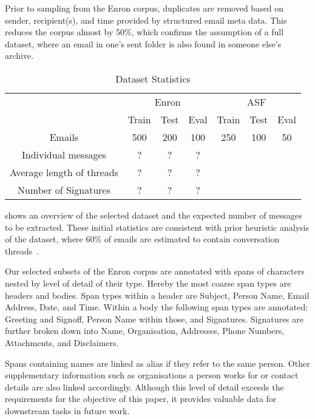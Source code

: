 \documentclass{llncs}
\begin{document}
Prior to sampling from the Enron corpus, duplicates are removed based on sender, recipient(s), and time provided by structured email meta data.
This reduces the corpus almost by 50\%, which confirms the assumption of a full dataset, where an email in one's sent folder is also found in someone else's archive.
\begin{table}
	\centering
	\caption{Dataset Statistics}
	\label{tab:dataset}
	
	\begin{tabular}{ccccccc}
		\toprule
		& \multicolumn{3}{c}{Enron} &  \multicolumn{3}{c}{ASF} \\
		\cmidrule(lr){2-4}
		\cmidrule(lr){5-7}
		& Train    & Test   & Eval   & Train   & Test   & Eval  \\
		\midrule
		Emails                    & 500      & 200    & 100    &   250   &  100   &   50  \\
		Individual messages       & ?        & ?      & ?      &         &        &       \\
		Average length of threads & ?        & ?      & ?      &         &        &       \\
		Number of Signatures      & ?        & ?      & ?      &         &        &       \\
		\bottomrule
	\end{tabular}
\end{table}
 shows an overview of the selected dataset and the expected number of messages to be extracted.
These initial statistics are consistent with prior heuristic analysis of the dataset, where 60\% of emails are estimated to contain conversation threads~\cite{enron}.

Our selected subsets of the Enron corpus are annotated with spans of characters nested by level of detail of their type.
Hereby the most coarse span types are headers and bodies.
Span types within a header are Subject, Person Name, Email Address, Date, and Time.
Within a body the following span types are annotated: Greeting and Signoff, Person Name within those, and Signatures. Signatures are further broken down into Name, Organisation, Addresses, Phone Numbers, Attachments, and Disclaimers.

Spans containing names are linked as alias if they refer to the same person.
Other supplementary information such as organisations a person works for or contact details are also linked accordingly.
Although this level of detail exceeds the requirements for the objective of this paper, it provides valuable data for downstream tasks in future work.
\end{document}

